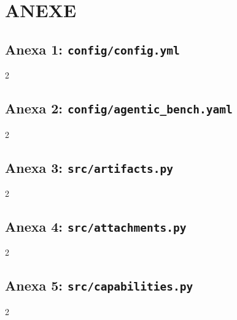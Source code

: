 \chapter*{ANEXE}


\section*{Anexa 1: \texttt{config/config.yml}}
\label{anexa:config}
\begin{multicols}{2}

\end{multicols}


\section*{Anexa 2: \texttt{config/agentic\_bench.yaml}}
\begin{multicols}{2}

\end{multicols}


\section*{Anexa 3: \texttt{src/artifacts.py}}
\begin{multicols}{2}

\end{multicols}


\section*{Anexa 4: \texttt{src/attachments.py}}
\begin{multicols}{2}

\end{multicols}


\section*{Anexa 5: \texttt{src/capabilities.py}}
\begin{multicols}{2}

\end{multicols}


